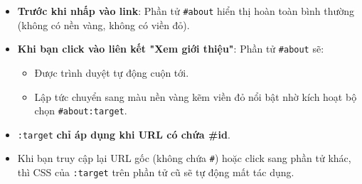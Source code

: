 \documentclass[11pt,oneside]{book}
\newcommand{\thd}[1]{\textcolor{white}{\textbf{\strut #1}}}
\newcommand{\codeinline}[1]{\textcolor{accentOrange}{\texttt{#1}}}
\begin{document}
\begin{browserWindow}
\sffamily\small
\begin{itemize}[leftmargin=1.5em, itemsep=4pt, parsep=0pt]
    \item \textbf{Trước khi nhấp vào link}: Phần tử \codeinline{\#about} hiển thị hoàn toàn bình thường (không có nền vàng, không có viền đỏ).
    \item \textbf{Khi bạn click vào liên kết "Xem giới thiệu"}: Phần tử \codeinline{\#about} sẽ:
    \begin{itemize}[leftmargin=1.2em, itemsep=2pt]
        \item Được trình duyệt tự động cuộn tới.
        \item Lập tức chuyển sang màu nền vàng kẽm viền đỏ nổi bật nhờ kích hoạt bộ chọn \codeinline{\#about:target}.
    \end{itemize}
\end{itemize}
\end{browserWindow}

\begin{tipBox}
\begin{itemize}[leftmargin=1.5em, itemsep=2pt, parsep=0pt]
    \item \codeinline{:target} \textbf{chỉ áp dụng khi URL có chứa \#id}.
    \item Khi bạn truy cập lại URL gốc (không chứa \codeinline{\#}) hoặc click sang phần tử khác, thì CSS của \codeinline{:target} trên phần tử cũ sẽ tự động mất tác dụng.
\end{itemize}
\end{tipBox}

\begin{prettyTableBox}
\sffamily\small
{}
\end{prettyTableBox}
\end{document}
